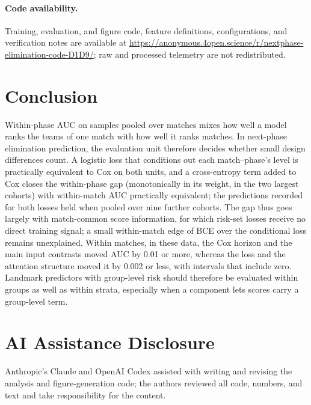 \documentclass[sigconf,anonymous]{acmart}
\newcommand{\artifacturl}{\url{https://anonymous.4open.science/r/nextphase-elimination-code-D1D9/}}
\begin{document}
\paragraph{Code availability.}
Training, evaluation, and figure code, feature definitions, configurations, and verification notes are available at \artifacturl{}; raw and processed telemetry are not redistributed.

\section{Conclusion}
\label{sec:conclusion}
Within-phase AUC on samples pooled over matches mixes how well a model ranks the teams of one match with how well it ranks matches. In next-phase elimination prediction, the evaluation unit therefore decides whether small design differences count. A logistic loss that conditions out each match--phase's level is practically equivalent to Cox on both units, and a cross-entropy term added to Cox closes the within-phase gap (monotonically in its weight, in the two largest cohorts) with within-match AUC practically equivalent; the predictions recorded for both losses held when pooled over nine further cohorts. The gap thus goes largely with match-common score information, for which risk-set losses receive no direct training signal; a small within-match edge of BCE over the conditional loss remains unexplained. Within matches, in these data, the Cox horizon and the main input contrasts moved AUC by 0.01 or more, whereas the loss and the attention structure moved it by 0.002 or less, with intervals that include zero. Landmark predictors with group-level risk should therefore be evaluated within groups as well as within strata, especially when a component lets scores carry a group-level term.

\section*{AI Assistance Disclosure}
Anthropic's Claude and OpenAI Codex assisted with writing and revising the analysis and figure-generation code; the authors reviewed all code, numbers, and text and take responsibility for the content.



\end{document}
